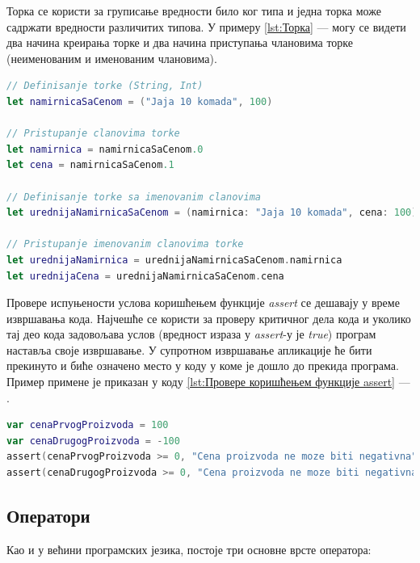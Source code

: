 \documentclass[12pt,oneside]{memoir}
\begin{document}
\indent Торка се користи за груписање вредности било ког типа и једна торка може садржати вредности различитих типова. У примеру \ref{lst:Торка} ---  могу се видети два начина креирања торке и два начина приступања члановима торке (неименованим и именованим члановима).

\begin{lstlisting}[caption=\textit{{Торка}}, label={lst:Торка}, language=Swift, frame=single]
// Definisanje torke (String, Int)
let namirnicaSaCenom = ("Jaja 10 komada", 100)

// Pristupanje clanovima torke
let namirnica = namirnicaSaCenom.0
let cena = namirnicaSaCenom.1

// Definisanje torke sa imenovanim clanovima
let urednijaNamirnicaSaCenom = (namirnica: "Jaja 10 komada", cena: 100)

// Pristupanje imenovanim clanovima torke
let urednijaNamirnica = urednijaNamirnicaSaCenom.namirnica
let urednijaCena = urednijaNamirnicaSaCenom.cena
\end{lstlisting}

\indent Провере испуњености услова коришћењем функције \textit{assert} се дешавају у време извршавања кода. Најчешће се користи за проверу критичног дела кода и уколико тај део кода задовољава услов (вредност израза у \textit{assert}-у је \textit{true}) програм наставља своје извршавање. У супротном извршавање апликације ће бити прекинуто и биће означено место у коду у коме је дошло до прекида програма. Пример примене је приказан у коду \ref{lst:Провере коришћењем функције assert} --- .

\begin{lstlisting}[caption=\textit{{Провере коришћењем функције assert}}, label={lst:Провере коришћењем функције assert}, language=Swift, frame=single]
var cenaPrvogProizvoda = 100
var cenaDrugogProizvoda = -100
assert(cenaPrvogProizvoda >= 0, "Cena proizvoda ne moze biti negativna") //true
assert(cenaDrugogProizvoda >= 0, "Cena proizvoda ne moze biti negativna") //false
\end{lstlisting}

\subsection{Оператори}

\indent Као и у већини програмских језика, постоје три основне врсте оператора: 
\end{document}
